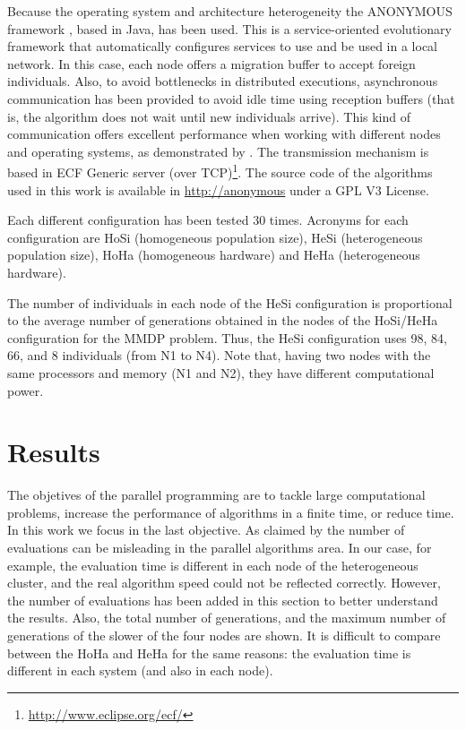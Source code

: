 Because the operating system and architecture heterogeneity the ANONYMOUS framework \cite{OSGILIATH}, based in Java, has been used. This is a service-oriented evolutionary framework that automatically configures services to use and be used in a local network. In this case, each node offers a migration buffer to accept foreign individuals. Also, to avoid bottlenecks in distributed executions, asynchronous communication has been provided to avoid idle time using reception buffers (that is, the algorithm does not wait until new individuals arrive). This kind of communication offers excellent performance when working with different nodes and operating systems, as demonstrated by \cite{HETEROGENEOUSHARD}. The transmission mechanism is based in ECF Generic server (over TCP)\footnote{\url{http://www.eclipse.org/ecf/}}. The source code of the algorithms used in this work is available in \url{http://anonymous} under a GPL V3 License.

Each different configuration has been tested 30 times. Acronyms for each configuration are HoSi (homogeneous population size), HeSi (heterogeneous population size), HoHa (homogeneous hardware) and HeHa (heterogeneous hardware). 

The number of individuals in each node of the HeSi configuration is proportional to the average number of generations obtained in the nodes of the HoSi/HeHa configuration for the MMDP problem. Thus, the HeSi configuration uses 98, 84, 66, and 8 individuals (from N1 to N4). Note that, having two nodes with the same processors and memory (N1 and N2), they have different computational power.

\section{Results}
\label{sec:results}

The objetives of the parallel programming are to tackle large computational problems, increase the performance of algorithms in a finite time, or reduce time. In this work we focus in the last objective.
As claimed by \cite{EVALUATIONPARALLEL} the number of evaluations can be misleading in the parallel algorithms area. In our case, for example, the evaluation time is different in each node of the heterogeneous cluster, and the real algorithm speed could not be reflected correctly. However, the number of evaluations has been added in this section to better understand the results. Also, the total number of generations, and the maximum number of generations of the slower of the four nodes are shown. It is difficult to compare between the HoHa and HeHa for the same reasons: the evaluation time is different in each system (and also in each node).

